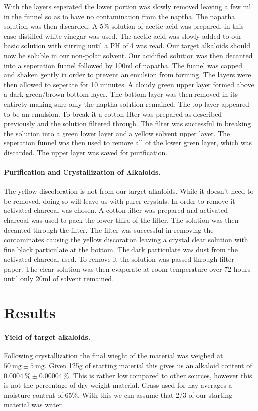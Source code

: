 \documentclass[12pt, a4paper]{article}
\begin{document}
    With the layers seperated the lower portion was slowly removed leaving a few ml in the funnel so as to have no contamination from the naptha. The napatha solution was then discarded.
    A 5\% solution of acetic acid was prepared, in this case distilled white vinegar was used. The acetic acid was slowly added to our basic solution with stirring until a PH of 4 was read. 
    Our target alkaloids should now be soluble in our non-polar solvent. Our acidified solution was then decanted into a seperation funnel followed by 100ml of napatha.
    The funnel was capped and shaken gently in order to prevent an emulsion from forming. The layers were then allowed to seperate for 10 minutes. 
    A cloudy green upper layer formed above a dark green/brown bottom layer. The bottom layer was then removed in its entirety making sure only the naptha solution remained.
    The top layer appeared to be an emulsion. To break it a cotton filter was prepared as described previously and the solution filtered through. 
    The filter was successful in breaking the solution into a green lower layer and a yellow solvent upper layer. 
    The seperation funnel was then used to remove all of the lower green layer, which was discarded. The upper layer was saved for purification. 
    

\paragraph{Purification and Crystallization of Alkaloids.}
    The yellow discoloration is not from our target alkaloids. While it doesn't need to be removed, doing so will leave us with purer crystals. 
    In order to remove it activated charcoal was chosen. A cotton filter was prepared and activated charcoal was used to pack the lower third of the filter. 
    The solution was then decanted through the filter.
     The filter was successful in removing the contaminates causing the yellow discoration leaving a crystal clear solution with fine black particulate at the bottom.
     The dark particulate was dust from the activated charcoal used. To remove it the solution was passed through filter paper.
     The clear solution was then evaporate at room temperature over 72 hours until only 20ml of solvent remained.

\section{Results}

\paragraph{Yield of target alkaloids.} Following crystallization the final wieght of the material was weighed at $\SI{50}{\mg} \pm \SI{5}\mg$. 
    Given 125g of starting material this gives us an alkaloid content of $\SI{0.0004}\percent \pm \SI{0.00004}\percent $. 
    This is rather low compared to other sources, however this is not the percentage of dry weight material.
    Grass used for hay averages a moisture content of 65\%. With this we can assume that 2/3 of our starting material was water 
\end{document}
